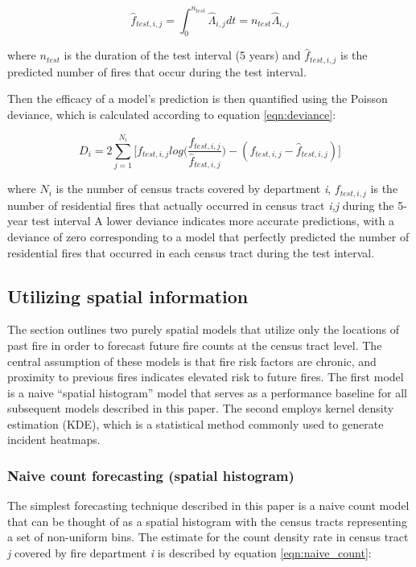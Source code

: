 \documentclass{svjour3}
\begin{document}
\begin{equation}
  \label{eqn:rate_integral}
  \hat{f}_{test,i,j} = \int_{0}^{n_{test}}\hat\Lambda_{i,j}dt
  = n_{test}\hat\Lambda_{i,j}
\end{equation}

\noindent where $n_{test}$ is the duration of the test interval (5 years) and $\hat{f}_{test,i,j}$ is the predicted number of fires that occur during the test interval.

Then the efficacy of a model's prediction is then quantified using the Poisson deviance, which is calculated according to equation \ref{eqn:deviance}:

\begin{equation}
  \label{eqn:deviance}
  D_i = 2\sum_{j=1}^{N_i}\bigg[
   f_{test,i,j}log\big(\frac{f_{test,i,j}}{\hat{f}_{test,i,j}}\big) - 
   (f_{test,i,j}-\hat{f}_{test,i,j}) 
  \bigg]
\end{equation}

\noindent where $N_i$ is the number of census tracts covered by department \textit{i}, $f_{test,i,j}$ is the number of residential fires that actually occurred in census tract \textit{i,j} during the 5-year test interval A lower deviance indicates more accurate predictions, with a deviance of zero corresponding to a model that perfectly predicted the number of residential fires that occurred in each census tract during the test interval.



\subsection{Utilizing spatial information}
The section outlines two purely spatial models that utilize only the locations of past fire in order to forecast future fire counts at the census tract level. The central assumption of these models is that fire risk factors are chronic, and proximity to previous fires indicates elevated risk to future fires. The first model is a naive ``spatial histogram'' model that serves as a performance baseline for all subsequent models described in this paper. The second employs kernel density estimation (KDE), which is a statistical method commonly used to generate incident heatmaps. 

\subsubsection{Naive count forecasting (spatial histogram)}
\label{countmodel}
The simplest forecasting technique described in this paper is a naive count model that can be thought of as a spatial histogram with the census tracts representing a set of non-uniform bins. The estimate for the count density rate in census tract \textit{j} covered by fire department \textit{i} is described by equation \ref{eqn:naive_count}:
\end{document}
